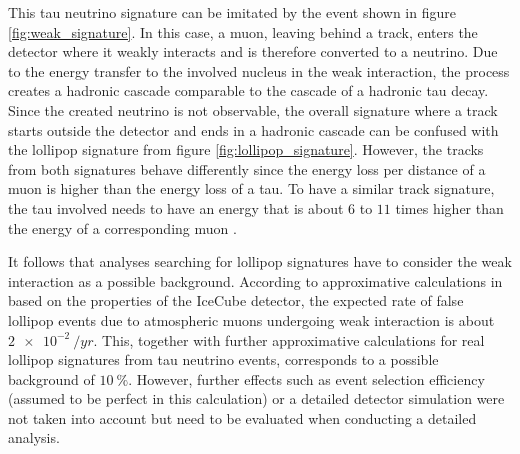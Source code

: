 This tau neutrino signature can be imitated by the event shown in figure \ref{fig:weak_signature}.
In this case, a muon, leaving behind a track, enters the detector where it weakly interacts and is therefore converted to a neutrino.
Due to the energy transfer to the involved nucleus in the weak interaction, the process creates a hadronic cascade comparable to the cascade of a hadronic tau decay.
Since the created neutrino is not observable, the overall signature where a track starts outside the detector and ends in a hadronic cascade can be confused with the lollipop signature from figure \ref{fig:lollipop_signature}.
However, the tracks from both signatures behave differently since the energy loss per distance of a muon is higher than the energy loss of a tau.
To have a similar track signature, the tau involved needs to have an energy that is about $\num{6}$ to $\num{11}$ times higher than the energy of a corresponding muon \cite{Sandrock:2018hpj}.

It follows that analyses searching for lollipop signatures have to consider the weak interaction as a possible background.
According to approximative calculations in \cite{Sandrock:2018hpj} based on the properties of the IceCube detector, the expected rate of false lollipop events due to atmospheric muons undergoing weak interaction is about $\SI{2e-2}{\per yr}$. 
This, together with further approximative calculations for real lollipop signatures from tau neutrino events, corresponds to a possible background of $\SI{10}{\percent}$.
However, further effects such as event selection efficiency (assumed to be perfect in this calculation) or a detailed detector simulation were not taken into account but need to be evaluated when conducting a detailed analysis.
